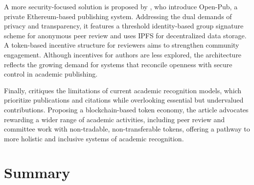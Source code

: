 \documentclass[final]{rc-book-2.14}
\begin{document}
A more security-focused solution is proposed by \cite{zhou_open-pub_2021}, who introduce Open-Pub, a private Ethereum-based publishing system. Addressing the dual demands of privacy and transparency, it features a threshold identity-based group signature scheme for anonymous peer review and uses IPFS for decentralized data storage. A token-based incentive structure for reviewers aims to strengthen community engagement. Although incentives for authors are less explored, the architecture reflects the growing demand for systems that reconcile openness with secure control in academic publishing.

Finally, \cite{lee_unblocking_2023} critiques the limitations of current academic recognition models, which prioritize publications and citations while overlooking essential but undervalued contributions. Proposing a blockchain-based token economy, the article advocates rewarding a wider range of academic activities,  including peer review and committee work with non-tradable, non-transferable tokens, offering a pathway to more holistic and inclusive systems of academic recognition.



\section{Summary}
\label{sec:review:summary}
\end{document}
